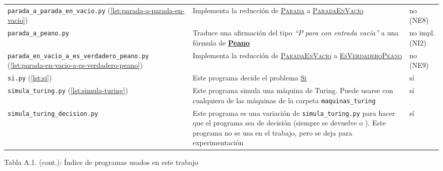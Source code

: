 \begin{tabularx}{\textwidth}{L{0.3} L{0.5} L{0.2}}
\texttt{parada\_a\_parada\_en}\linebreak\texttt{\_vacio.py} \linebreak \small{(\cref{lst:parada-a-parada-en-vacio})} \vspace{4pt} & Implementa la reducción de \hyperref[prob:parada]{\textsc{Parada}} a \hyperref[prob:parada-en-vacio]{\textsc{ParadaEnVacío}} & no (NE8) \\

\texttt{parada\_a\_peano.py} & Traduce una afirmación del tipo \emph{``$P$ para con entrada vacía''} a una fórmula de \hyperref[sl:peano]{\textbf{Peano}} \vspace{4pt} & no impl. (NI2) \\

\texttt{parada\_en\_vacio\_a\_es}\linebreak\texttt{\_verdadero\_peano.py} \linebreak \small{(\cref{lst:parada-en-vacio-a-es-verdadero-peano})} \vspace{4pt} & Implementa la reducción de \hyperref[prob:parada-en-vacio]{\textsc{ParadaEnVacío}} a \hyperref[prob:es-verdadero-peano]{\textsc{EsVerdaderoPeano}} & no (NE9) \\

\texttt{si.py} \linebreak \small{(\cref{lst:si})} \vspace{4pt} & Este programa decide el problema \hyperref[prob:si]{\textsc{Sí}} & sí \\

\texttt{simula\_turing.py} \linebreak \small{(\cref{lst:simula-turing})} & Este programa simula una máquina de Turing. Puede usarse con cualquiera de las máquinas de la carpeta \texttt{maquinas\_turing} \vspace{4pt} & sí \\

\texttt{simula\_turing}\linebreak\texttt{\_decision.py} & Este programa es una variación de \texttt{simula\_turing.py} para hacer que el programa sea de decisión (siempre se devuelve  o ). Este programa no se usa en el trabajo, pero se deja para experimentación \vspace{2pt} & sí \\
\midrule
\end{tabularx}
\vspace*{-0.2cm}
\begin{tabla}
\caption*{Tabla A.1. (cont.): Índice de programas usados en este trabajo}
\label{tab:indice-programas}
\end{tabla}



